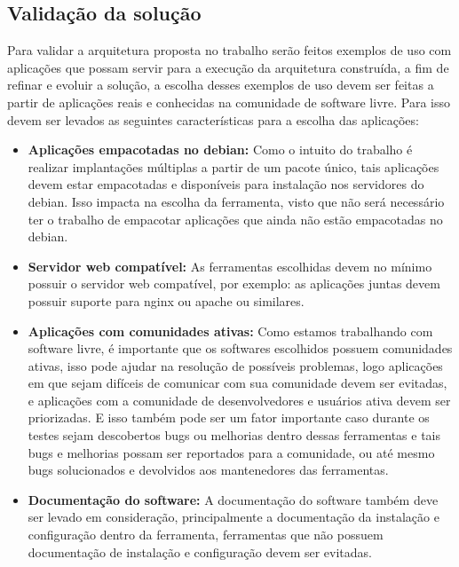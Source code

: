 \subsection{Validação da solução}
\label{subsection:validacao}

Para validar a arquitetura proposta no trabalho serão feitos exemplos de uso
com aplicações que possam servir para a execução da arquitetura construída, a
fim de refinar e evoluir a solução, a escolha desses exemplos de uso devem ser
feitas a partir de aplicações reais e conhecidas na comunidade de software livre.
 Para isso devem ser levados as seguintes características para a escolha das aplicações:

\begin{itemize}
  \item  \textbf{Aplicações empacotadas no debian:} Como o intuito do trabalho
  é realizar implantações múltiplas a partir de um pacote único, tais aplicações
  devem estar empacotadas e disponíveis para instalação nos servidores do debian.
  Isso impacta na escolha da ferramenta, visto que não será necessário ter o trabalho
  de empacotar aplicações que ainda não estão empacotadas no debian.
  \item  \textbf{Servidor web compatível:} As ferramentas escolhidas devem no
  mínimo possuir o servidor web compatível, por exemplo: as aplicações juntas
  devem possuir suporte para nginx ou apache ou similares.
  \item  \textbf{Aplicações com comunidades ativas:} Como estamos trabalhando
  com software livre, é importante que os softwares escolhidos possuem comunidades
  ativas, isso pode ajudar na resolução de possíveis problemas, logo aplicações
  em que sejam difíceis de comunicar com sua comunidade devem ser evitadas, e
  aplicações com a comunidade de desenvolvedores e usuários ativa devem ser priorizadas.
  E isso também pode ser um fator importante caso durante os testes sejam descobertos
  bugs ou melhorias dentro dessas ferramentas e tais bugs e melhorias possam ser
  reportados para a comunidade, ou até mesmo bugs solucionados e devolvidos aos mantenedores
  das ferramentas.
  \item  \textbf{Documentação do software:} A documentação do software também deve
  ser levado em consideração, principalmente a documentação da instalação e configuração
  dentro da ferramenta, ferramentas que não possuem documentação de instalação e
  configuração devem ser evitadas.
\end{itemize}

